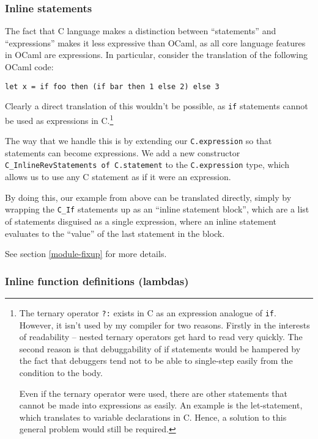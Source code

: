 \documentclass[12pt,a4paper,twoside,openright]{report}
\begin{document}
\subsubsection{Inline statements}\label{c-inline-statements}

The fact that C language makes a distinction between ``statements'' and
``expressions'' makes it less expressive than OCaml, as all core language
features in OCaml are expressions. In particular, consider the translation of
the following OCaml code:

\begin{lstlisting}
let x = if foo then (if bar then 1 else 2) else 3
\end{lstlisting}

Clearly a direct translation of this wouldn't be possible, as \lstinline!if!
statements cannot be used as expressions in C.\footnote{
    The ternary operator \lstinline!?:! exists in C as an expression analogue
    of \lstinline!if!.  However, it isn't used by my compiler for two reasons.
    Firstly in the interests of readability -- nested ternary operators get
    hard to read very quickly. The second reason is that debuggability of if
    statements would be hampered by the fact that debuggers tend not to be able
    to single-step easily from the condition to the body.

    Even if the ternary operator were used, there are other statements that
    cannot be made into expressions as easily. An example is the let-statement,
    which translates to variable declarations in C. Hence, a solution to this
    general problem would still be required.}

The way that we handle this is by extending our \lstinline!C.expression! so
that statements can become expressions.  We add a new constructor
\lstinline!C_InlineRevStatements of C.statement! to the
\lstinline!C.expression! type, which allows us to use any C statement as if it
were an expression.

By doing this, our example from above can be translated directly, simply by
wrapping the \lstinline!C_If! statements up as an ``inline statement block'',
which are a list of statements disguised as a single expression, where an
inline statement evaluates to the ``value'' of the last statement in the block.

See section \ref{module-fixup} for more details.


\subsubsection{Inline function definitions (lambdas)}\label{c-inline-functions}
\end{document}
